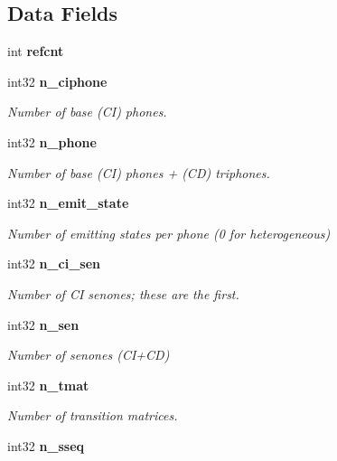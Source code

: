 \subsection*{Data Fields}
\begin{DoxyCompactItemize}
\item 
int {\bfseries refcnt}\label{structbin__mdef__s_a35282c2ff4e75fd87186e38dbf14e7f1}

\item 
int32 {\bf n\+\_\+ciphone}\label{structbin__mdef__s_a84d5f7acc6d85ba8c7611945f9c5e4e7}

\begin{DoxyCompactList}\small\item\em Number of base (C\+I) phones. \end{DoxyCompactList}\item 
int32 {\bf n\+\_\+phone}\label{structbin__mdef__s_ad746dbb3f8108f575a95182f96b4b18f}

\begin{DoxyCompactList}\small\item\em Number of base (C\+I) phones + (C\+D) triphones. \end{DoxyCompactList}\item 
int32 {\bf n\+\_\+emit\+\_\+state}\label{structbin__mdef__s_a2ad87254182be424ac6ff1234274f134}

\begin{DoxyCompactList}\small\item\em Number of emitting states per phone (0 for heterogeneous) \end{DoxyCompactList}\item 
int32 {\bf n\+\_\+ci\+\_\+sen}\label{structbin__mdef__s_ad7c318d6db85fd4b8ac13a81c145bbb8}

\begin{DoxyCompactList}\small\item\em Number of C\+I senones; these are the first. \end{DoxyCompactList}\item 
int32 {\bf n\+\_\+sen}\label{structbin__mdef__s_a3d1c202165d8e5e153a73d708ca28109}

\begin{DoxyCompactList}\small\item\em Number of senones (C\+I+\+C\+D) \end{DoxyCompactList}\item 
int32 {\bf n\+\_\+tmat}\label{structbin__mdef__s_a979557ad4f8369e84d93f633512345ca}

\begin{DoxyCompactList}\small\item\em Number of transition matrices. \end{DoxyCompactList}\item 
int32 {\bf n\+\_\+sseq}\label{structbin__mdef__s_ab9dad211cbc12eb6f848482bcf78d47f}


\end{DoxyCompactItemize}
